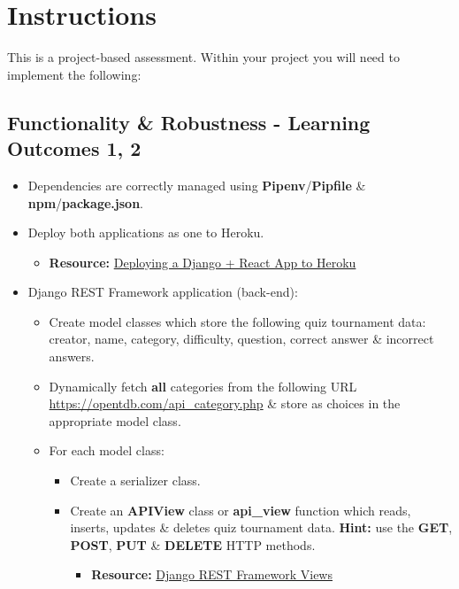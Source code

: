 \documentclass{article}
\begin{document}
\newpage

\section*{Instructions} 
This is a project-based assessment. Within your project you will need to implement the following:

\subsection*{Functionality \& Robustness - Learning Outcomes 1, 2}
\begin{itemize}
	\item Dependencies are correctly managed using \textbf{Pipenv}/\textbf{Pipfile} \& \textbf{npm}/\textbf{package.json}.
	\item Deploy both applications as one to Heroku.
	\begin{itemize}
		\item \textbf{Resource:} \href{https://dev.to/shakib609/deploy-your-django-react-js-app-to-heroku-2bck}{Deploying a Django + React App to Heroku}
	\end{itemize}
	\item Django REST Framework application (back-end):
	\begin{itemize}
		\item Create model classes which store the following quiz tournament data: creator, name, category, difficulty, question, correct answer \& incorrect answers. 
		\item Dynamically fetch \textbf{all} categories from the following URL \href{https://opentdb.com/api\_category.php}{https://opentdb.com/api\_category.php} \& store as choices in the appropriate model class.
		\item For each model class:
		\begin{itemize}
			\item Create a serializer class. 
			\item Create an \textbf{APIView} class or \textbf{api\_view} function which reads, inserts, updates \& deletes quiz tournament data. \textbf{Hint:} use the \textbf{GET}, \textbf{POST}, \textbf{PUT} \& \textbf{DELETE} HTTP methods.
			\begin{itemize}
				\item \textbf{Resource:} \href{https://www.django-rest-framework.org/api-guide/views}{Django REST Framework Views}
			\end{itemize}
		\end{itemize} 

\end{itemize}
\end{itemize}
\end{document}
